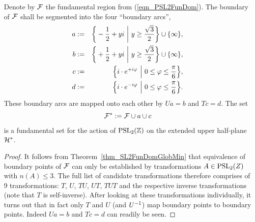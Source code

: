 \begin{theorem}
\label{thm_PSL2FunSet}
Denote by $\mathcal{F}$ the fundamental region from (\ref{eqn_PSL2FunDom}). The boundary of $\mathcal{F}$ shall be segmented into the four ``boundary arcs'',
\begin{eqnarray*}
a &:=& \bigg\{ -\frac{1}{2} + y i \ \bigg| \ y \ge \frac{\sqrt{3}}{2} \bigg\} \cup \{\infty\},\\
b &:=& \bigg\{ +\frac{1}{2} + y i \ \bigg| \ y \ge \frac{\sqrt{3}}{2} \bigg\} \cup \{\infty\},\\
c &:=& \Big\{ i \cdot e^{+i \varphi} \ \Big| \ 0 \le \varphi \le \frac{\pi}{6} \Big\},\\
d &:=& \Big\{ i \cdot e^{-i \varphi} \ \Big| \ 0 \le \varphi \le \frac{\pi}{6} \Big\}.
\end{eqnarray*}
These boundary arcs are mapped onto each other by $Ua = b$ and $Tc = d$. The set
\begin{equation}
\label{eqn_PSL2FunSet}
\mathcal{F}^\ast := \mathcal{F} \cup a \cup c
\end{equation}
is a fundamental set for the action of $\operatorname{PSL}_{2}(\mathbb{Z})$ on the extended upper half-plane $\mathcal{H}^\ast$.
\end{theorem}
\begin{proof}
It follows from Theorem~\ref{thm_SL2FunDomGlobMin} that equivalence of boundary points of $\mathcal{F}$ can only be established by transformations $A \in \operatorname{PSL}_{2}(Z)$ with $n(A) \le 3$. The full list of candidate transformations therefore comprises of 9 transformations: $T$, $U$, $TU$, $UT$, $TUT$ and the respective inverse transformations (note that $T$ is self-inverse). After looking at these transformations individually, it turns out that in fact only $T$ and $U$ (and ${U}^{-1}$) map boundary points to boundary points. Indeed $Ua = b$ and $Tc = d$ can readily be seen.
\end{proof}

